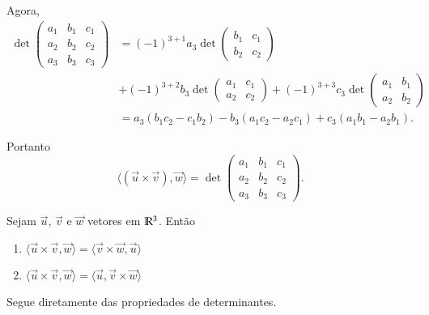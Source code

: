 Agora,
\begin{align*}
  \det \begin{pmatrix}
    a_1 & b_1 & c_1\\
    a_2 & b_2 & c_2\\
    a_3 & b_3 & c_3
  \end{pmatrix} & = (-1)^{3+1}a_3\det \begin{pmatrix}
    b_1 & c_1\\
    b_2 & c_2
  \end{pmatrix} \\ &+ (-1)^{3+2}b_3\det \begin{pmatrix}
    a_1 & c_1\\
    a_2 & c_2
  \end{pmatrix} + (-1)^{3+3}c_3\det \begin{pmatrix}
    a_1 & b_1\\
    a_2 & b_2
  \end{pmatrix}\\ &= a_3(b_1c_2 - c_1b_2) - b_3(a_1c_2 - a_2c_1) + c_3(a_1b_1 - a_2b_1).
\end{align*}

Portanto
\begin{equation}
  \langle(\vec{u}\times\vec{v}), \vec{w}\rangle = \det \begin{pmatrix}
    a_1 & b_1 & c_1\\
    a_2 & b_2 & c_2\\
    a_3 & b_3 & c_3
  \end{pmatrix}.
\end{equation}

\begin{proposicao}
  Sejam $\vec{u}$, $\vec{v}$ e $\vec{w}$ vetores em $\mathbb{R}^3$. Ent\~ao
  \begin{enumerate}[label=({\alph*})]
    \item $\langle\vec{u}\times\vec{v}, \vec{w}\rangle = \langle\vec{v}\times\vec{w}, \vec{u}\rangle$
    \item $\langle\vec{u}\times\vec{v}, \vec{w}\rangle = \langle\vec{u}, \vec{v}\times\vec{w}\rangle$
  \end{enumerate}
\end{proposicao}
\begin{prova}
  Segue diretamente das propriedades de determinantes.
\end{prova}

